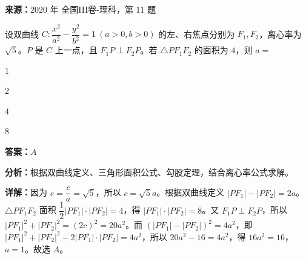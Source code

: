 \begin{question}[points=5]
\textbf{来源：}2020 年 全国III卷-理科，第 11 题\par
设双曲线 $C:\dfrac{x^2}{a^2}-\dfrac{y^2}{b^2}=1\ (a>0,b>0)$ 的左、右焦点分别为 $F_1,F_2$，离心率为 $\sqrt{5}$。$P$ 是 $C$ 上一点，且 $F_1P\perp F_2P$。若 $\triangle PF_1F_2$ 的面积为 $4$，则 $a=$
\begin{choices}
  \item $1$
  \item $2$
  \item $4$
  \item $8$
\end{choices}
\begin{solution}
\textbf{答案：}$A$

\textbf{分析：}根据双曲线定义、三角形面积公式、勾股定理，结合离心率公式求解。

\textbf{详解：}因为 $e=\dfrac{c}{a}=\sqrt{5}$，所以 $c=\sqrt{5}a$。根据双曲线定义 $|PF_1|-|PF_2|=2a$。$\triangle PF_1F_2$ 面积 $\dfrac12|PF_1|\cdot|PF_2|=4$，得 $|PF_1|\cdot|PF_2|=8$。又 $F_1P\perp F_2P$，所以 $|PF_1|^2+|PF_2|^2=(2c)^2=20a^2$。而 $(|PF_1|-|PF_2|)^2=4a^2$，即 $|PF_1|^2+|PF_2|^2-2|PF_1|\cdot|PF_2|=4a^2$，所以 $20a^2-16=4a^2$，得 $16a^2=16$，$a=1$。故选 $A$。
\end{solution}
\end{question}

